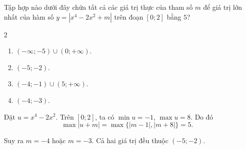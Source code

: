 \begin{baitap}
	Tập hợp nào dưới đây chứa tất cả các giá trị thực của tham số $m$ để giá trị lớn nhất của hàm số $y = \left|x^4 - 2x^2 + m\right|$ trên đoạn $[0; 2]$ bằng $5$?
	\begin{multicols}{2}
		\begin{enumerate}
			\item $(-\infty; -5) \cup (0; +\infty)$.
			\item $(-5; -2)$.
			\item $(-4; -1) \cup (5; +\infty)$.
			\item $(-4; -3)$.
		\end{enumerate}
	\end{multicols}
	\begin{traloi}
		Đặt \(u=x^4-2x^2\). Trên \([0;2]\), ta có \(\min u=-1\), \(\max u=8\). Do đó $$\max|u+m|=\max\{|m-1|,|m+8|\}=5.$$
		
		Suy ra \(m=-4\) hoặc \(m=-3\). Cả hai giá trị đều thuộc \((-5;-2)\).
	\end{traloi}
\end{baitap}
